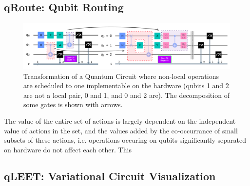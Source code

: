 \subsection{qRoute: Qubit Routing}

\begin{figure}[H]
    \centering
    \includegraphics[width=\linewidth]{figures/intro/routing-transform.png}
    \caption{Transformation of a Quantum Circuit where non-local operations are scheduled to one implementable on the hardware (qubits 1 and 2 are not a local pair, 0 and 1, and 0 and 2 are). The decomposition of some gates is shown with arrows.}
\end{figure}

The value of the entire set of actions is largely dependent on the independent value of actions in the set, and the values added by the co-occurrance of small subsets of these actions, i.e. operations occuring on qubits significantly separated on hardware do not affect each other. This 

\subsection{qLEET: Variational Circuit Visualization}


